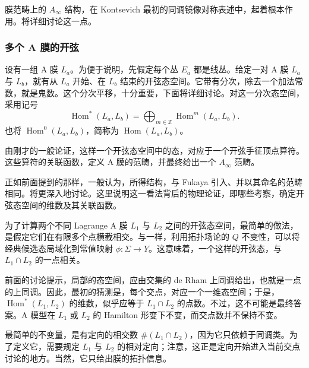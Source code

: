 膜范畴上的 $A_\infty$ 结构，在 Kontsevich 最初的同调镜像对称表述中，起着根本作用。将详细讨论这一点。

\subsubsection{多个 A 膜的开弦}\label{sec:3.6.2.5}

设有一组 A 膜 $L_a$。为便于说明，先假定每个丛 $E_a$ 都是线丛。给定一对 A 膜 $L_a$ 与 $L_b$，就有从 $L_a$ 开始、在 $L_b$ 结束的开弦态空间。它带有分次，除去一个加法常数，就是鬼数。这个分次平移，十分重要，下面将详细讨论。对这一分次态空间，采用记号
\begin{equation}\label{eq:3.183}
\operatorname{Hom}^*(L_a,L_b)
=\bigoplus_{m\in\mathbb{Z}}\operatorname{Hom}^m(L_a,L_b).
\end{equation}
也将 $\operatorname{Hom}^0(L_a,L_b)$，简称为 $\operatorname{Hom}(L_a,L_b)$。

由刚才的一般论证，这样一个开弦态空间中的态，对应于一个开弦手征顶点算符。这些算符的关联函数，定义 A 膜的范畴，并最终给出一个 $A_\infty$ 范畴。

正如前面提到的那样，一般认为，所得结构，与 Fukaya 引入、并以其命名的范畴相同。将更深入地讨论。这里说明这一看法背后的物理论证，即哪些考察，确定开弦态空间的维数及其关联函数。

为了计算两个不同 Lagrange A 膜 $L_1$ 与 $L_2$ 之间的开弦态空间，最简单的做法，是假定它们在有限多个点横截相交。与一样，利用拓扑场论的 $Q$ 不变性，可以将经典候选态局域化到常值映射 $\phi\colon\Sigma\to Y$。这意味着，一个这样的开弦态，与 $L_1\cap L_2$ 的一点相关。

前面的讨论提示，局部的态空间，应由交集的 de Rham 上同调给出，也就是一点的上同调。因此，最初的猜测是，每个交点，对应一个一维态空间；于是，$\operatorname{Hom}^*(L_1,L_2)$ 的维数，似乎应等于 $L_1\cap L_2$ 的点数。不过，这不可能是最终答案。A 模型在 $L_1$ 或 $L_2$ 的 Hamilton 形变下不变，而交点数并不保持不变。

最简单的不变量，是有定向的相交数 $\#(L_1\cap L_2)$，因为它只依赖于同调类。为了定义它，需要规定 $L_1$ 与 $L_2$ 的相对定向；注意，这正是定向开始进入当前交点讨论的地方。当然，它只给出膜的拓扑信息。

